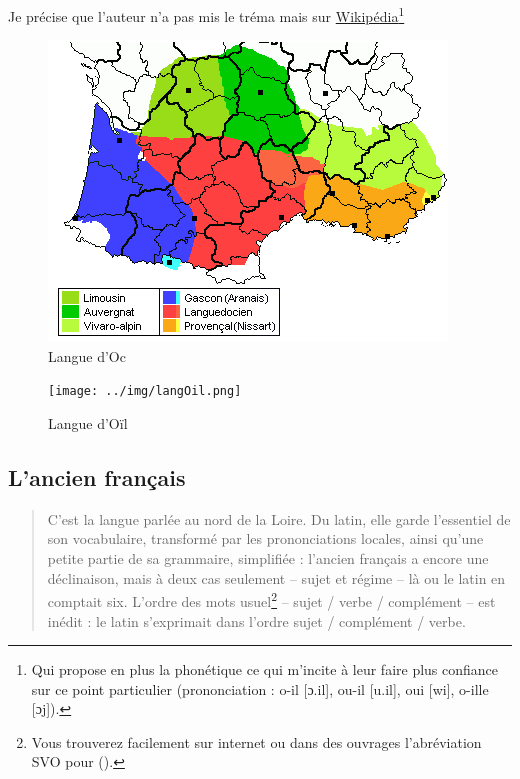 Je précise que l'auteur n'a pas mis le tréma mais sur
\href{https://fr.wikipedia.org/wiki/Langue_d\%27o\%C3\%AFl}{Wikipédia}\footnote{Qui propose en plus la phonétique ce qui m'incite à
  leur faire plus confiance sur ce point particulier (prononciation :
  o-il [ɔ.il], ou-il [u.il], oui [wi], o-ille [ɔj]).}


\begin{subfigures}
  \label{fig:fig4a5}
  \begin{figure}
    \centering
    \includegraphics[scale=.725]{../img/langOc.png}
    \caption{Langue d'Oc}
    \label{fig:fig4}
  \end{figure}
  \begin{figure}
    \centering
    \texttt{[image: ../img/langOil.png]}
    \caption{Langue d'Oïl}
    \label{fig:fig5}
  \end{figure}
\end{subfigures}

\subsection{L'ancien français}\label{subsec:ancienfr}

\begin{quotation}
  C'est la langue parlée au nord de la Loire. Du latin, elle garde
  l'essentiel de son vocabulaire, transformé par les prononciations
  locales, ainsi qu'une petite partie de sa grammaire, simplifiée :
  l'ancien français a encore une déclinaison, mais à deux cas
  seulement -- sujet et régime -- là ou le latin en comptait
  six. L'ordre des mots usuel\footnote{Vous trouverez facilement sur
    internet ou dans des ouvrages l'abréviation SVO pour  ().} -- sujet / verbe / complément -- est
  inédit : le latin s'exprimait dans l'ordre sujet / complément / verbe.
\end{quotation}

